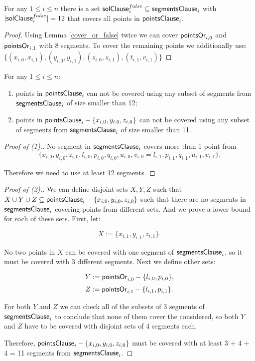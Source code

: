\begin{lemma}
\label{cover_clauses_solution_false}
For any $1 \le i \le n$ there is
a set $\mathsf{solClause}^{false}_i \subseteq \mathsf{segmentsClause}_i$
with $|\mathsf{solClause}^{false}_i| = 12$
that covers all points in $\mathsf{pointsClause}_{i}$.
\end{lemma}

\begin{proof}
Using Lemma \ref{cover_or_false} twice we can
cover $\mathsf{pointsOr}_{i,0}$ and  $\mathsf{pointsOr}_{i,1}$
with 8 segments.
To cover the remaining points we additionally use:
$\{ (x_{i, 0}, x_{i, 1}), (y_{i, 0}, y_{i, 1}),
(z_{i, 0}, z_{i, 1}), (t_{i, 1}, v_{i, 1}) \}$
\end{proof}

\begin{lemma}
\label{cover_clauses_segments_no_less}
For any $1 \le i \le n$:
\begin{enumerate}[label={(\arabic*)}]
	\item points in $\mathsf{pointsClause}_{i}$ can not be covered 
	using any subset of segments
	from $\mathsf{segmentsClause}_i$ of size smaller than 12;
	\item points in $\mathsf{pointsClause}_{i} - \{ x_{i, 0}, y_{i, 0}, z_{i, 0}\}$
	can not be covered using any subset of segments
	from $\mathsf{segmentsClause}_i$ of size smaller than 11.
\end{enumerate}
\end{lemma}


\begin{proof}[Proof of (1).]
No segment in $\mathsf{segmentsClause}_i$ covers more than 1 point from
$$\{ x_{i, 0}, y_{i, 0}, z_{i, 0}, l_{i, 0}, p_{i, 0}, q_{i, 0},
u_{i, 0}, v_{i, 0} = l_{i, 1}, p_{i, 1}, q_{i, 1}, u_{i, 1}, v_{i, 1} \}.$$

Therefore we need to use at least 12 segments.
\end{proof}

\begin{proof}[Proof of (2).]

We can define disjoint sets $X, Y, Z$ such that
$X \cup Y \cup Z \subseteq \mathsf{pointsClause}_{i} - \{x_{i, 0}, y_{i, 0}, z_{i, 0}\}$
such that there are no segments in $\mathsf{segmentsClause}_i$ covering points from different sets.
And we prove a lower bound for each of these sets.
First, let:

$$X := \{x_{i, 1}, y_{i, 1}, z_{i, 1}\}.$$

No two points in $X$ can be covered with one segment
of $\mathsf{segmentsClause}_i$, so it must be covered with 3 different segments.
Next we define other sets:

$$Y := \mathsf{pointsOr}_{i,0} - \{l_{i, 0}, p_{i, 0}\},$$
$$Z := \mathsf{pointsOr}_{i,1} - \{l_{i, 1}, p_{i, 1}\}.$$


For both $Y$ and $Z$ we can check all of the subsets of 3 segments
of $\mathsf{segmentsClause}_i$
to conclude that none of them cover the considered,
so both $Y$ and $Z$ have to be covered with 
disjoint sets of 4 segments each.

Therefore, $\mathsf{pointsClause}_{i} - \{x_{i, 0}, y_{i, 0}, z_{i, 0}\}$
must be covered with at least 3 + 4 + 4 = 11 segments from $\mathsf{segmentsClause}_i$.
\end{proof}


